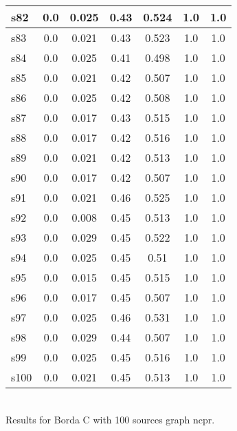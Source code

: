 \documentclass{article}
\begin{document}
\begin{tabular}{|l|c|c|c|c|c|c|}
\hline
s82 &0.0 & 0.025 & 0.43 & 0.524 & 1.0 & 1.0\\
\hline
s83 &0.0 & 0.021 & 0.43 & 0.523 & 1.0 & 1.0\\
\hline
s84 &0.0 & 0.025 & 0.41 & 0.498 & 1.0 & 1.0\\
\hline
s85 &0.0 & 0.021 & 0.42 & 0.507 & 1.0 & 1.0\\
\hline
s86 &0.0 & 0.025 & 0.42 & 0.508 & 1.0 & 1.0\\
\hline
s87 &0.0 & 0.017 & 0.43 & 0.515 & 1.0 & 1.0\\
\hline
s88 &0.0 & 0.017 & 0.42 & 0.516 & 1.0 & 1.0\\
\hline
s89 &0.0 & 0.021 & 0.42 & 0.513 & 1.0 & 1.0\\
\hline
s90 &0.0 & 0.017 & 0.42 & 0.507 & 1.0 & 1.0\\
\hline
s91 &0.0 & 0.021 & 0.46 & 0.525 & 1.0 & 1.0\\
\hline
s92 &0.0 & 0.008 & 0.45 & 0.513 & 1.0 & 1.0\\
\hline
s93 &0.0 & 0.029 & 0.45 & 0.522 & 1.0 & 1.0\\
\hline
s94 &0.0 & 0.025 & 0.45 & 0.51 & 1.0 & 1.0\\
\hline
s95 &0.0 & 0.015 & 0.45 & 0.515 & 1.0 & 1.0\\
\hline
s96 &0.0 & 0.017 & 0.45 & 0.507 & 1.0 & 1.0\\
\hline
s97 &0.0 & 0.025 & 0.46 & 0.531 & 1.0 & 1.0\\
\hline
s98 &0.0 & 0.029 & 0.44 & 0.507 & 1.0 & 1.0\\
\hline
s99 &0.0 & 0.025 & 0.45 & 0.516 & 1.0 & 1.0\\
\hline
s100 &0.0 & 0.021 & 0.45 & 0.513 & 1.0 & 1.0\\
\hline
\end{tabular}\\

\noindent Results for Borda C with 100 sources graph ncpr.
\end{document}
